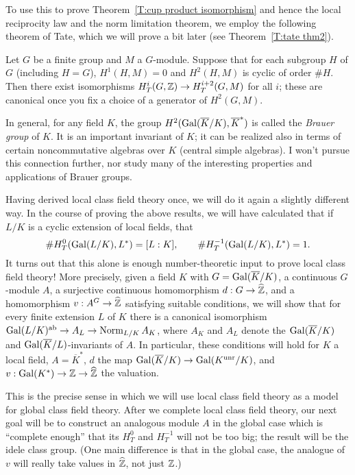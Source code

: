 To use this to prove Theorem~\ref{T:cup product isomorphism} and hence
the local reciprocity law and the norm limitation theorem, we employ
the following theorem of Tate, which we will prove a bit later
(see Theorem~\ref{T:tate thm2}).
\begin{theorem} \label{T:tate thm1}
Let $G$ be a finite group and $M$ a $G$-module. Suppose that for each
subgroup $H$ of $G$ (including $H=G$), $H^1(H,M) = 0$ and $H^2(H,M)$
is cyclic of order $\#H$. Then there exist isomorphisms
$H^i_T(G, \mathbb{Z}) \to H^{i+2}_T(G, M)$ for all $i$; these are canonical
once you fix a choice of a generator of $H^2(G,M)$.
\end{theorem}

In general, for any field $K$, the group $H^2(\operatorname{Gal}(\overline{K}/K),
\overline{K}^*)$ is called the \emph{Brauer group} of $K$. It is an
important invariant of $K$; it can be realized also in terms of certain
noncommutative algebras over $K$ (central simple algebras). I won't
pursue this connection further, nor study many of the interesting properties
and applications of Brauer groups.


Having derived local class field theory once, we will do it again a slightly
different way. In the course of proving the above results, we will
have calculated that if $L/K$ is a cyclic extension of local fields, that
\[
\#H^0_T(\operatorname{Gal}(L/K), L^*) = [L:K], \qquad \#H^{-1}_T(\operatorname{Gal}(L/K), L^*)
=1.
\]
It turns out that this alone is enough number-theoretic input to prove
local class field theory! More precisely, given a field $K$ with
$G = \operatorname{Gal}(\overline{K}/K)$, a continuous $G$-module $A$,
a surjective continuous homomorphism $d: G
\to \widehat{\mathbb{Z}}$, and a homomorphism $v: A^G \to \widehat{\mathbb{Z}}$
satisfying suitable conditions, we will show
that for every finite extension $L$ of $K$
there is a canonical isomorphism $\operatorname{Gal}(L/K)^{\operatorname{ab}} \to
A_L \to \operatorname{Norm}_{L/K} A_K$, where $A_K$ and $A_L$ denote the
$\operatorname{Gal}(\overline{K}/K)$ and $\operatorname{Gal}(\overline{K}/L)$-invariants of $A$.
In particular, these conditions will hold for $K$ a local field,
$A = \overline{K}^*$, $d$ the map $\operatorname{Gal}(\overline{K}/K) \to \operatorname{Gal}(K^{\operatorname{unr}}/K)$,
and $v: \operatorname{Gal}(K^*) \to \mathbb{Z} \to \widehat{\mathbb{Z}}$ the valuation.

This is the precise sense in which we will use local class field theory
as a model for global class field theory. After we complete local
class field theory, our next goal will be to construct an analogous
module $A$ in the global case which is ``complete enough'' that its
$H^0_T$ and $H^{-1}_T$ will not be too big; the result will be the idele
class group. (One main difference is that
in the global case, the analogue of $v$ will really take values in
$\widehat{\mathbb{Z}}$, not just $\mathbb{Z}$.) 

